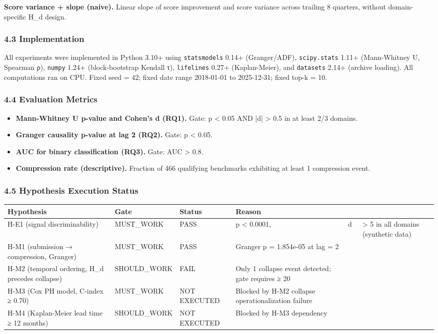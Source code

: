 \textbf{Score variance + slope (naive).} Linear slope of score improvement and score variance across trailing 8 quarters, without domain-specific H_d design.

\subsubsection{4.3 Implementation}

All experiments were implemented in Python 3.10+ using \texttt{statsmodels} 0.14+ (Granger/ADF), \texttt{scipy.stats} 1.11+ (Mann-Whitney U, Spearman ρ), \texttt{numpy} 1.24+ (block-bootstrap Kendall τ), \texttt{lifelines} 0.27+ (Kaplan-Meier), and \texttt{datasets} 2.14+ (archive loading). All computations ran on CPU. Fixed seed = 42; fixed date range 2018-01-01 to 2025-12-31; fixed top-k = 10.

\subsubsection{4.4 Evaluation Metrics}

\begin{itemize}
\item \textbf{Mann-Whitney U p-value and Cohen's d (RQ1).} Gate: p < 0.05 AND |d| > 0.5 in at least 2/3 domains.
\item \textbf{Granger causality p-value at lag 2 (RQ2).} Gate: p < 0.05.
\item \textbf{AUC for binary classification (RQ3).} Gate: AUC > 0.8.
\item \textbf{Compression rate (descriptive).} Fraction of 466 qualifying benchmarks exhibiting at least 1 compression event.
\end{itemize}

\subsubsection{4.5 Hypothesis Execution Status}

\begin{table}[htbp]
\centering
\begin{tabular}{llllll}
\toprule
Hypothesis & Gate & Status & Reason &  &  \\
\midrule
H-E1 (signal discriminability) & MUST_WORK & PASS & p < 0.0001, \ & d\ & > 5 in all domains (synthetic data) \\
H-M1 (submission → compression, Granger) & MUST_WORK & PASS & Granger p = 1.854e-05 at lag = 2 &  &  \\
H-M2 (temporal ordering, H_d precedes collapse) & SHOULD_WORK & FAIL & Only 1 collapse event detected; gate requires ≥ 20 &  &  \\
H-M3 (Cox PH model, C-index ≥ 0.70) & MUST_WORK & NOT EXECUTED & Blocked by H-M2 collapse operationalization failure &  &  \\
H-M4 (Kaplan-Meier lead time ≥ 12 months) & SHOULD_WORK & NOT EXECUTED & Blocked by H-M3 dependency &  &  \\
\bottomrule
\end{tabular}
\end{table}

